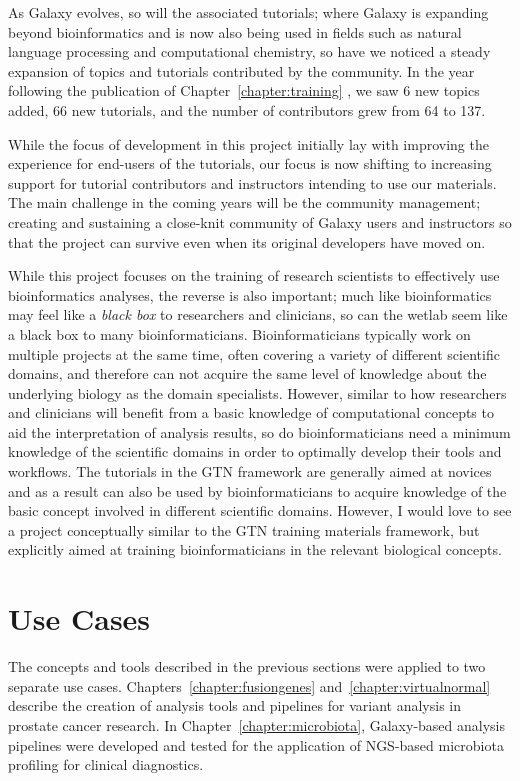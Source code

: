 As Galaxy evolves, so will the associated tutorials; where Galaxy is expanding beyond bioinformatics and is now also being used in fields such as natural language processing and computational chemistry, so have we noticed a steady expansion of topics and tutorials contributed by the community. In the year following the publication of Chapter~\ref{chapter:training} , we saw 6 new topics added, 66 new tutorials, and the number of contributors grew from 64 to 137.

While the focus of development in this project initially lay with improving the experience for end-users of the tutorials, our focus is now shifting to increasing support for tutorial contributors and instructors intending to use our materials. The main challenge in the coming years will be the community management; creating and sustaining a close-knit community of Galaxy users and instructors so that the project can survive even when its original developers have moved on.

While this project focuses on the training of research scientists to effectively use bioinformatics analyses, the reverse is also important; much like bioinformatics may feel like a \emph{black box} to researchers and clinicians, so can the wetlab seem like a black box to many bioinformaticians.
Bioinformaticians typically work on multiple projects at the same time, often covering a variety of different scientific domains, and therefore can not acquire the same level of knowledge about the underlying biology as the domain specialists.
However, similar to how researchers and clinicians will benefit from a basic knowledge of computational concepts to aid the interpretation of analysis results, so do bioinformaticians need a minimum knowledge of the scientific domains in order to optimally develop their tools and workflows.
The tutorials in the GTN framework are generally aimed at novices and as a result can also be used by bioinformaticians to acquire knowledge of the basic concept involved in different scientific domains.
However, I would love to see a project conceptually similar to the GTN training materials framework, but explicitly aimed at training bioinformaticians in the relevant biological concepts.


\section{Use Cases}

The concepts and tools described in the previous sections were applied to two separate use cases. Chapters~\ref{chapter:fusiongenes} and~\ref{chapter:virtualnormal} describe the creation of analysis tools and pipelines for variant analysis in prostate cancer research. In Chapter~\ref{chapter:microbiota}, Galaxy-based analysis pipelines were developed and tested for the application of NGS-based microbiota profiling for clinical diagnostics.


